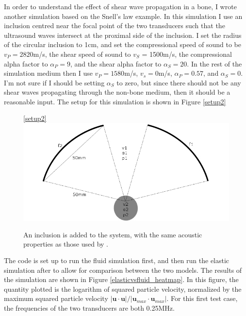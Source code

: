 \documentclass[10pt,a4paper]{article}
\begin{document}
In order to understand the effect of shear wave propagation in a bone, I wrote another simulation based on the Snell's law example. In this simulation I use an inclusion centred near the focal point of the two transducers such that the ultrasound waves intersect at the proximal side of the inclusion. I set the radius of the circular inclusion to 1cm, and set the compressional speed of sound to be $v_P = 2820$m/s, the shear speed of sound to $v_S$ = 1500m/s, the compressional alpha factor to $\alpha_P = 9$, and the shear alpha factor to $\alpha_S = 20$. In the rest of the simulation medium then I use $v_P = 1580$m/s, $v_s = 0$m/s, $\alpha_P = 0.57$, and $\alpha_S = 0$. I'm not sure if I should be setting $\alpha_S$ to zero, but since there should not be any shear waves propagating through the non-bone medium, then it should be a reasonable input. The setup for this simulation is shown in Figure \ref{setup2}
\begin{figure}[H] \ref{setup2}
\centering
\includegraphics[scale=0.5]{setup2}
\caption{An inclusion is added to the system, with the same acoustic properties as those used by \cite{treeby2015contribution}.}
\end{figure}

The code is set up to run the fluid simulation first, and then run the elastic simulation after to allow for comparison between the two models. The results of the simulation are shown in Figure \ref{elasticvsfluid_heatmap}. In this figure, the quantity plotted is the logarithm of squared particle velocity, normalized by the maximum squared particle velocity $\vert \textbf{u} \cdot \textbf{u} \vert / \vert  \textbf{u}_{max} \cdot \textbf{u}_{max}\vert $. For this first test case, the frequencies of the two transducers are both 0.25MHz. 
\end{document}
